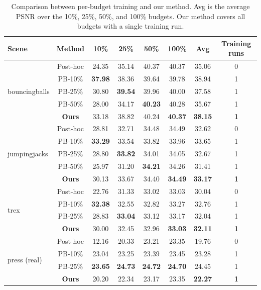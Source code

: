 \documentclass[pdflatex,sn-mathphys]{sn-jnl}
\begin{document}
\begin{table}[!htbp]
\caption{Comparison between per-budget training and our method. Avg is the average PSNR over the 10\%, 25\%, 50\%, and 100\% budgets. Our method covers all budgets with a single training run.}
\label{tab:per_budget_full}
\centering
\scriptsize
\setlength{\tabcolsep}{3pt}
\begin{tabular}{lccccccc}
\toprule
Scene & Method & 10\% & 25\% & 50\% & 100\% & Avg & Training runs \\
\midrule
\multirow{5}{*}{bouncingballs} & Post-hoc   & 24.35 & 35.14 & 40.37 & 40.37 & 35.06 & 0 \\
& PB-10\% & \textbf{37.98} & 38.36 & 39.64 & 39.78 & 38.94 & 1 \\
& PB-25\% & 30.80 & \textbf{39.54} & 39.96 & 40.00 & 37.58 & 1 \\
& PB-50\% & 28.00 & 34.17 & \textbf{40.23} & 40.28 & 35.67 & 1 \\
& \textbf{Ours}    & 33.18 & 38.82 & 40.24 & \textbf{40.37} & \textbf{38.15} & \textbf{1} \\
\midrule
\multirow{5}{*}{jumpingjacks} & Post-hoc   & 28.81 & 32.71 & 34.48 & 34.49 & 32.62 & 0 \\
& PB-10\% & \textbf{33.29} & 33.54 & 33.82 & 33.96 & 33.65 & 1 \\
& PB-25\% & 28.80 & \textbf{33.82} & 34.01 & 34.05 & 32.67 & 1 \\
& PB-50\% & 25.97 & 31.20 & \textbf{34.21} & 34.26 & 31.41 & 1 \\
& \textbf{Ours}    & 30.13 & 33.67 & 34.40 & \textbf{34.49} & \textbf{33.17} & \textbf{1} \\
\midrule
\multirow{4}{*}{trex} & Post-hoc   & 22.76 & 31.33 & 33.02 & 33.03 & 30.04 & 0 \\
& PB-10\% & \textbf{32.38} & 32.55 & 32.82 & 33.27 & 32.76 & 1 \\
& PB-25\% & 28.83 & \textbf{33.04} & 33.12 & 33.17 & 32.04 & 1 \\
& \textbf{Ours}    & 30.00 & 32.45 & 32.96 & \textbf{33.03} & \textbf{32.11} & \textbf{1} \\
\midrule
\multirow{4}{*}{press (real)} & Post-hoc   & 12.16 & 20.33 & 23.21 & 23.35 & 19.76 & 0 \\
& PB-10\% & 23.04 & 23.25 & 23.39 & 23.45 & 23.28 & 1 \\
& PB-25\% & \textbf{23.65} & \textbf{24.73} & \textbf{24.72} & \textbf{24.70} & 24.45 & 1 \\
& \textbf{Ours}    & 20.20 & 22.34 & 23.17 & 23.35 & \textbf{22.27} & \textbf{1} \\
\bottomrule
\end{tabular}
\end{table}
\end{document}
